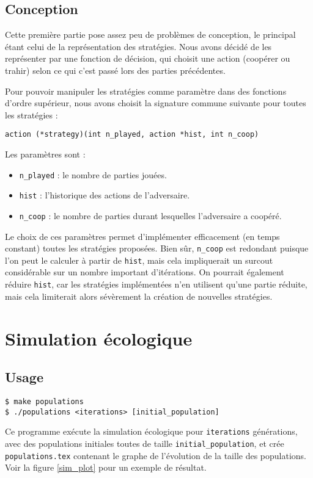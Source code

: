 \documentclass[draft,10pt]{article}
\begin{document}
\subsection{Conception}
Cette première partie pose assez peu de problèmes de conception, 
le principal étant celui de la représentation des stratégies.
Nous avons décidé de les représenter par une fonction de décision, qui choisit une action
(coopérer ou trahir) selon ce qui c'est passé lors des parties précédentes.

Pour pouvoir manipuler les stratégies comme paramètre dans des fonctions d'ordre supérieur, 
nous avons choisit la signature commune suivante pour toutes les stratégies :
\begin{verbatim}
action (*strategy)(int n_played, action *hist, int n_coop)
\end{verbatim}

Les paramètres sont :
\begin{itemize}
\item \verb|n_played| : le nombre de parties jouées.
\item \verb|hist| : l'historique des actions de l'adversaire.
\item \verb|n_coop| : le nombre de parties durant lesquelles l'adversaire a coopéré.
\end{itemize}
Le choix de ces paramètres permet d'implémenter efficacement (en temps constant)
toutes les stratégies proposées. Bien sûr, \verb|n_coop| est redondant puisque
l'on peut le calculer à partir de \verb|hist|, mais cela impliquerait un surcout
considérable sur un nombre important d'itérations.
On pourrait également réduire \verb|hist|, car les stratégies implémentées n'en
utilisent qu'une partie réduite, mais cela limiterait alors sévèrement la
création de nouvelles stratégies.


\section{Simulation écologique}
\subsection{Usage}
\begin{verbatim}
$ make populations
$ ./populations <iterations> [initial_population]
\end{verbatim}

Ce programme exécute la simulation écologique pour \verb|iterations| générations,
avec des populations initiales toutes de taille \verb|initial_population|,
et crée \verb|populations.tex| contenant le graphe de l'évolution de la taille des populations.
Voir la figure \ref{sim_plot} pour un exemple de résultat.
\end{document}
